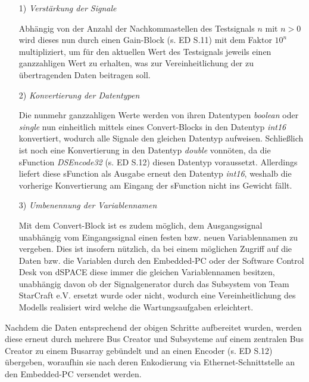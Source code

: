 \documentclass[fontsize = 12pt, paper = a4]{scrreprt}
\begin{document}
\begin{itemize}

\item[1)] \textit{Verstärkung der Signale}

Abhängig von der Anzahl der Nachkommastellen des Testsignals $n$ mit $n > 0$ wird dieses nun durch einen Gain-Block (s. ED S.11) mit dem Faktor $10^n$ multipliziert, um für den aktuellen Wert des Testsignals jeweils einen ganzzahligen Wert zu erhalten,
was zur Vereinheitlichung der zu übertragenden Daten beitragen soll.

\newpage

\item[2)] \textit{Konvertierung der Datentypen}

Die nunmehr ganzzahligen Werte werden von ihren Datentypen \textit{boolean} oder \textit{single} nun einheitlich mittels eines Convert-Blocks in den Datentyp \textit{int16} konvertiert, wodurch alle Signale den gleichen Datentyp aufweisen. Schließlich ist noch eine Konvertierung in den Datentyp \textit{double} vonnöten, da die sFunction \textit{DSEncode32} (s. ED S.12) diesen Datentyp voraussetzt. Allerdings liefert diese sFunction als Ausgabe erneut den Datentyp \textit{int16}, weshalb die vorherige Konvertierung am Eingang der sFunction nicht ins Gewicht fällt.  

\item[3)] \textit{Umbenennung der Variablennamen}

Mit dem Convert-Block ist es zudem möglich, dem Ausgangssignal unabhängig vom Eingangssignal einen festen bzw. neuen Variablennamen zu vergeben. Dies ist insofern nützlich, da bei einem möglichen Zugriff auf die Daten bzw. die Variablen durch
den Embedded-PC oder der Software Control Desk von dSPACE diese immer die gleichen Variablennamen besitzen, unabhängig davon ob der Signalgenerator durch das Subsystem von Team StarCraft e.V. ersetzt
wurde oder nicht, wodurch eine Vereinheitlichung des Modells realisiert wird welche die Wartungsaufgaben erleichtert.

\end{itemize}

Nachdem die Daten entsprechend der obigen Schritte aufbereitet wurden, werden diese erneut durch mehrere Bus Creator und Subsysteme auf einem zentralen Bus Creator zu einem Busarray gebündelt und  an einen Encoder (s. ED S.12) übergeben, woraufhin sie nach deren Enkodierung via Ethernet-Schnittstelle an den Embedded-PC versendet werden. \\
\end{document}

